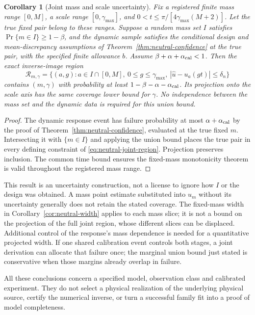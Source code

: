 \documentclass[11pt]{article}
\newtheorem{corollary}[theorem]{Corollary}
\theoremstyle{definition}
\begin{document}
\begin{corollary}[Joint mass and scale uncertainty]
\label{cor:neutral-joint-region}
Fix a registered finite mass range $[0,M]$, a scale range
$[0,\gamma_{\max}]$, and
$0<t\le\pi/[4\gamma_{\max}(M+2)]$. Let the true fixed pair belong to
these ranges. Suppose a random mass set $I$ satisfies
$\Pr\{m\in I\}\ge1-\beta$, and the dynamic sample satisfies the
conditional design and mean-discrepancy assumptions of
Theorem~\ref{thm:neutral-confidence} at the true pair, with the specified
finite allowance $b$. Assume $\beta+\alpha+\alpha_{\rm cal}<1$.
Then the exact inverse-image region
\begin{equation}
 \mathcal R_{m,\gamma}=
 \{(a,g):a\in I\cap[0,M],\ 0\le g\le\gamma_{\max},\
       |\widehat u-u_a(gt)|\le\delta_n\}
 \label{eq:neutral-joint-region}
\end{equation}
contains $(m,\gamma)$ with probability at least
$1-\beta-\alpha-\alpha_{\rm cal}$. Its projection onto the scale axis
has the same coverage lower bound for $\gamma$. No independence between
the mass set and the dynamic data is required for this union bound.
\end{corollary}
\begin{proof}
The dynamic response event has failure probability at most
$\alpha+\alpha_{\rm cal}$ by the proof of
Theorem~\ref{thm:neutral-confidence}, evaluated at the true fixed $m$.
Intersecting it with $\{m\in I\}$ and applying the union bound places
the true pair in every defining constraint of
\eqref{eq:neutral-joint-region}. Projection preserves inclusion.
The common time bound ensures the fixed-mass monotonicity theorem is
valid throughout the registered mass range.
\end{proof}

This result is an uncertainty construction, not a license to ignore how
$I$ or the design was obtained. A mass point estimate substituted into
$u_m$ without its uncertainty generally does not retain the stated
coverage. The fixed-mass width in Corollary~\ref{cor:neutral-width} applies
to each mass slice; it is not a bound on the projection of the full joint
region, whose different slices can be displaced. Additional control of
the response's mass dependence is needed for a quantitative projected
width. If one shared calibration event controls both stages, a joint
derivation can allocate that failure once; the marginal union bound just
stated is conservative when those margins already overlap in failure.

All these conclusions concern a specified model, observation class and
calibrated experiment. They do not select a physical realization of the
underlying physical source, certify the numerical inverse, or turn a successful
family fit into a proof of model completeness.
\end{document}
